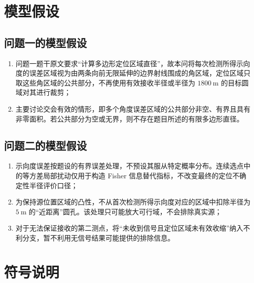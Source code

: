 \documentclass[withoutpreface,bwprint]{cumcmthesis}
\begin{document}
\section{模型假设}

\subsection{问题一的模型假设}

\begin{enumerate}
  \item 问题一题干原文要求“计算多边形定位区域直径”，故本问将每次检测所得示向度的误差区域视为由两条向前无限延伸的边界射线围成的角区域，定位区域只取这些角区域的公共部分，不再使用有效接收半径或半径为 $1800\ \mathrm{m}$ 的目标圆域对其进行裁剪；
  \item 主要讨论交会有效的情形，即多个角度误差区域的公共部分非空、有界且具有非零面积。若公共部分为空或无界，则不存在题目所述的有限多边形直径。
\end{enumerate}

\subsection{问题二的模型假设}

\begin{enumerate}
  \item 示向度误差按题设的有界误差处理，不预设其服从特定概率分布。连续选点中的等方差局部扰动仅用于构造 Fisher 信息替代指标，不改变最终的定位不确定性半径评价口径；
  \item 为保持源位置区域的凸性，不从首次检测所得示向度对应的区域中扣除半径为 $5\ \mathrm{m}$ 的“近距离”圆孔。该处理只可能放大可行域，不会排除真实源；
  \item 对于无法保证接收的第二测点，将“未收到信号且定位区域未有效收缩”纳入不利分支，暂不利用无信号结果可能提供的排除信息。
\end{enumerate}

\section{符号说明}
\end{document}
